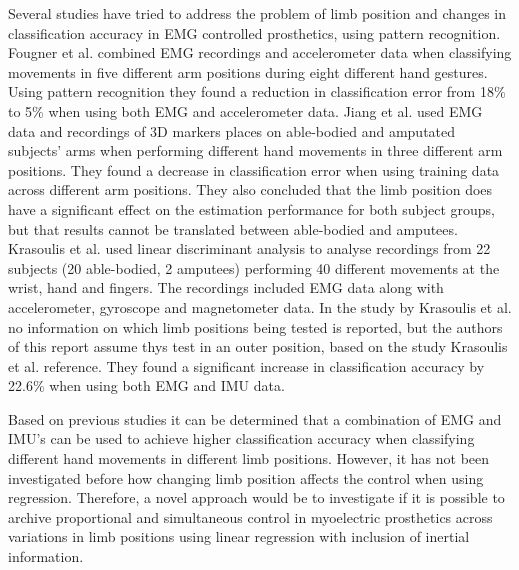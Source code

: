 Several studies have tried to address the problem of limb position and changes in classification accuracy in EMG controlled prosthetics, using pattern recognition. \cite{Fougner2011, Jiang2013, Krasoulis2017} Fougner et al. combined EMG recordings and accelerometer data when classifying movements in five different arm positions during eight different hand gestures. Using pattern recognition they found a reduction in classification error from 18\% to 5\% when using both EMG and accelerometer data. \cite{Fougner2011} Jiang et al. used EMG data and recordings of 3D markers places on able-bodied and amputated subjects' arms when performing different hand movements in three different arm positions. They found a decrease in classification error when using training data across different arm positions. They also concluded that the limb position does have a significant effect on the estimation performance for both subject groups, but that results cannot be translated between able-bodied and amputees. \cite{Jiang2013} Krasoulis et al. used linear discriminant analysis to analyse recordings from 22 subjects (20 able-bodied, 2 amputees) performing 40 different movements at the wrist, hand and fingers. The recordings included EMG data along with accelerometer, gyroscope and magnetometer data. In the study by Krasoulis et al. \cite{Krasoulis2017} no information on which limb positions being tested is reported, but the authors of this report assume thys test in an outer position, based on the study Krasoulis et al. reference. They found a significant increase in classification accuracy by 22.6\% when using both EMG and IMU data. \cite{Krasoulis2017} 

Based on previous studies it can be determined that a combination of EMG and IMU's can be used to achieve higher classification accuracy when classifying different hand movements in different limb positions. However, it has not been investigated before how changing limb position affects the control when using regression. Therefore, a novel approach would be to investigate if it is possible to archive proportional and simultaneous control in myoelectric prosthetics across variations in limb positions using linear regression with inclusion of inertial information.






